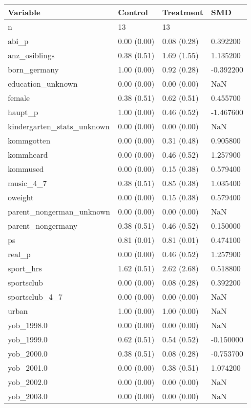 \begin{tabular}{llll}
\toprule
Variable & Control & Treatment & SMD \\
\midrule
n & 13 & 13 &  \\
abi\_p & 0.00 (0.00) & 0.08 (0.28) & 0.392200 \\
anz\_osiblings & 0.38 (0.51) & 1.69 (1.55) & 1.135200 \\
born\_germany & 1.00 (0.00) & 0.92 (0.28) & -0.392200 \\
education\_unknown & 0.00 (0.00) & 0.00 (0.00) & NaN \\
female & 0.38 (0.51) & 0.62 (0.51) & 0.455700 \\
haupt\_p & 1.00 (0.00) & 0.46 (0.52) & -1.467600 \\
kindergarten\_stats\_unknown & 0.00 (0.00) & 0.00 (0.00) & NaN \\
kommgotten & 0.00 (0.00) & 0.31 (0.48) & 0.905800 \\
kommheard & 0.00 (0.00) & 0.46 (0.52) & 1.257900 \\
kommused & 0.00 (0.00) & 0.15 (0.38) & 0.579400 \\
music\_4\_7 & 0.38 (0.51) & 0.85 (0.38) & 1.035400 \\
oweight & 0.00 (0.00) & 0.15 (0.38) & 0.579400 \\
parent\_nongerman\_unknown & 0.00 (0.00) & 0.00 (0.00) & NaN \\
parent\_nongermany & 0.38 (0.51) & 0.46 (0.52) & 0.150000 \\
ps & 0.81 (0.01) & 0.81 (0.01) & 0.474100 \\
real\_p & 0.00 (0.00) & 0.46 (0.52) & 1.257900 \\
sport\_hrs & 1.62 (0.51) & 2.62 (2.68) & 0.518800 \\
sportsclub & 0.00 (0.00) & 0.08 (0.28) & 0.392200 \\
sportsclub\_4\_7 & 0.00 (0.00) & 0.00 (0.00) & NaN \\
urban & 1.00 (0.00) & 1.00 (0.00) & NaN \\
yob\_1998.0 & 0.00 (0.00) & 0.00 (0.00) & NaN \\
yob\_1999.0 & 0.62 (0.51) & 0.54 (0.52) & -0.150000 \\
yob\_2000.0 & 0.38 (0.51) & 0.08 (0.28) & -0.753700 \\
yob\_2001.0 & 0.00 (0.00) & 0.38 (0.51) & 1.074200 \\
yob\_2002.0 & 0.00 (0.00) & 0.00 (0.00) & NaN \\
yob\_2003.0 & 0.00 (0.00) & 0.00 (0.00) & NaN \\
\bottomrule
\end{tabular}
